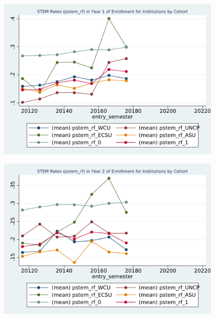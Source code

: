 \begin{figure}[h!]
\begin{centering}
\includegraphics[scale=1]{"figures/pstem_rf_by_entry_1_INSTITUTION_STEM"}
\end{centering}
\end{figure}
\newpage
\begin{figure}[h!]
\begin{centering}
\includegraphics[scale=1]{"figures/pstem_rf_by_entry_2_INSTITUTION_STEM"}
\end{centering}
\end{figure}
\newpage

